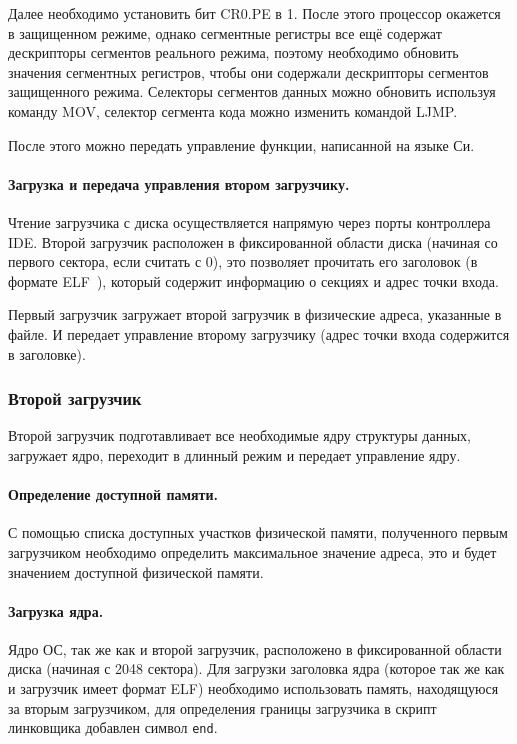 Далее необходимо установить бит CR0.PE в 1. После этого процессор окажется в защищенном режиме,
однако сегментные регистры все ещё содержат дескрипторы сегментов реального режима, поэтому необходимо
обновить значения сегментных регистров, чтобы они содержали дескрипторы сегментов защищенного
режима. Селекторы сегментов данных можно обновить используя команду MOV, селектор сегмента кода
можно изменить командой LJMP.

После этого можно передать управление функции, написанной на языке Си.

\paragraph{Загрузка и передача управления втором загрузчику.} Чтение загрузчика с диска
осуществляется напрямую через порты контроллера IDE. Второй загрузчик расположен в фиксированной
области диска (начиная со первого сектора, если считать с 0), это позволяет прочитать его заголовок
(в формате ELF~\cite{elf}), который содержит информацию о секциях и адрес точки входа.

Первый загрузчик загружает второй загрузчик в физические адреса, указанные в файле. И передает
управление второму загрузчику (адрес точки входа содержится в заголовке).


\subsubsection*{Второй загрузчик}
Второй загрузчик подготавливает все необходимые ядру структуры данных, загружает ядро,
переходит в длинный режим и передает управление ядру.

\paragraph{Определение доступной памяти.} С помощью списка доступных участков физической
памяти, полученного первым загрузчиком необходимо определить максимальное значение адреса,
это и будет значением доступной физической памяти.

\paragraph{Загрузка ядра.} Ядро ОС, так же как и второй загрузчик, расположено в фиксированной
области диска (начиная с 2048 сектора). Для загрузки заголовка ядра (которое так же как и
загрузчик имеет формат ELF) необходимо использовать память, находящуюся за вторым загрузчиком,
для определения границы загрузчика в скрипт линковщика добавлен символ \texttt{end}.

